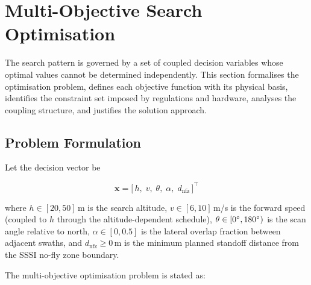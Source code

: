 %

\section{Multi-Objective Search Optimisation}\label{sec:formal-opt}

The search pattern is governed by a set of coupled decision variables whose optimal values cannot be determined independently. This section formalises the optimisation problem, defines each objective function with its physical basis, identifies the constraint set imposed by regulations and hardware, analyses the coupling structure, and justifies the solution approach.

\subsection{Problem Formulation}\label{sec:problem-formulation}

Let the decision vector be

\begin{equation}\label{eq:decision-vector}
  \mathbf{x} = \bigl[\, h,\; v,\; \theta,\; \alpha,\; d_{\mathrm{nfz}} \,\bigr]^\top
\end{equation}

\noindent where $h \in [20, 50]$\,m is the search altitude, $v \in [6, 10]$\,m/s is the forward speed (coupled to $h$ through the altitude-dependent schedule), $\theta \in [0\degree, 180\degree)$ is the scan angle relative to north, $\alpha \in [0, 0.5]$ is the lateral overlap fraction between adjacent swaths, and $d_{\mathrm{nfz}} \geq 0$\,m is the minimum planned standoff distance from the SSSI no-fly zone boundary.

The multi-objective optimisation problem is stated as:

